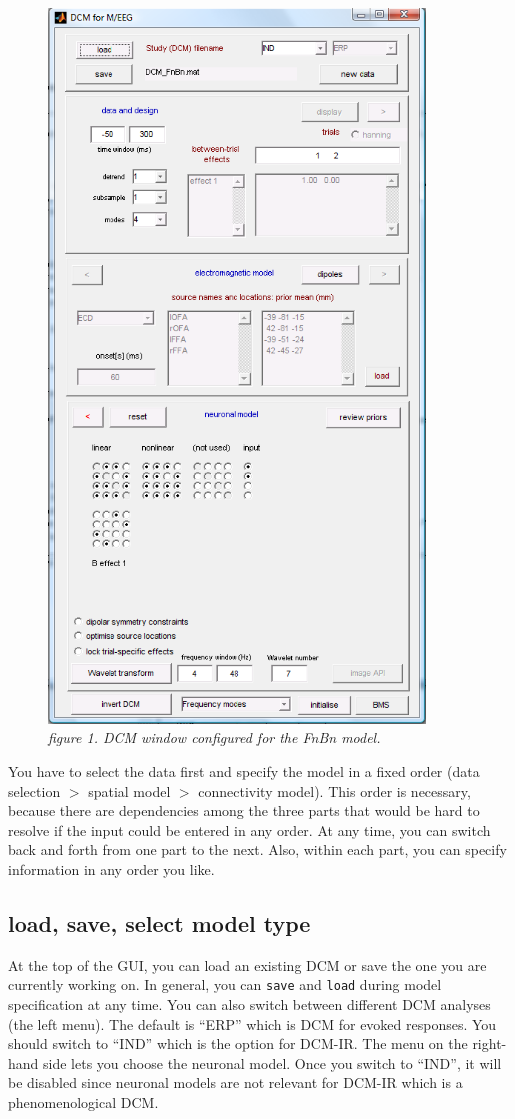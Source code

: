 \begin{figure}
\begin{center}
\includegraphics[width=100mm]{dcm_ir/figures/figure1}
\caption{\em figure 1. DCM window configured for the FnBn model.\label{dcm-ir:fig:1}}
\end{center}
\end{figure}

You have to select the data first and specify the model in a fixed order (data selection $>$ spatial model $>$
connectivity model). This order is necessary, because there are dependencies among the three parts that would be hard to resolve
if the input could be entered in any order. At any time, you can switch back and forth from one part to the next. Also, within each part, you can specify information in any order you like.

\subsection{load, save, select model type}
At the top of the GUI, you can load an existing DCM or save the one you are currently working on. In general, you can \texttt{save} and \texttt{load} during model specification at any time. You can also switch between different DCM analyses (the left menu). The default is ``ERP'' which is DCM for evoked responses. You should switch to ``IND'' which is the option for DCM-IR. The menu on the right-hand side lets you choose the neuronal model. Once you switch to ``IND'', it will be disabled since neuronal models are not relevant for DCM-IR which is a phenomenological DCM.

